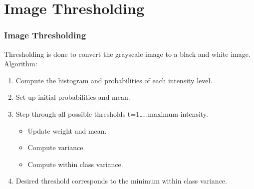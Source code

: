 \documentclass[12pt]{beamer}
\begin{document}
\section{Image Thresholding}
\begin{frame}[c]
\frametitle{Image Thresholding}
Thresholding is done to convert the grayscale image to a black and white image.\\[8pt]
Algorithm:
\begin{enumerate}
\item Compute the histogram and probabilities of each intensity level.
\item Set up initial probabilities and mean.
\item Step through all possible thresholds t=1…..maximum intensity.
\begin{itemize}
\footnotesize \item Update weight and mean.
\footnotesize \item Compute variance.
\footnotesize \item Compute within class  variance.
\end{itemize}
\item Desired threshold corresponds to the minimum within class variance.
\end{enumerate}
\end{frame}
\end{document}
